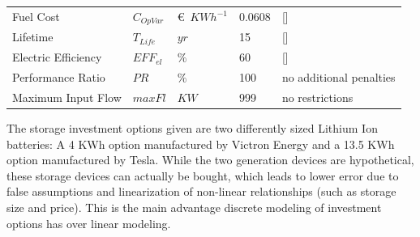 \documentclass[
	11pt,								%
	DIV10,								%
	a4paper,         					%
	oneside,							%
	headheight=20pt,					%
	footheight=20pt,					%
    parskip=full,						%
    listof=totoc,						%
	bibliography=totoc,					%
	index=totoc,						%
]{scrartcl}
\begin{document}
\begin{table}[H]
\begin{tabular}{lllll}
		Fuel	 Cost           			& $C_{OpVar}$     		& \euro\ $KWh^{-1}$   	& 0.0608			& [\cite{NaturalGasPrices2018}]  \\
		Lifetime                    & $T_{Life}$     		& $yr$  				& 15 				& [\cite{LAUINGER201624}]    \\
		Electric Efficiency         & $EFF_{el}$       		& $\%$  				& 60				& [\cite{BlueGENWorldsMost2018}]  \\
		Performance Ratio           & $PR$     		& $\%$  				& 100				& no additional penalties  \\
		Maximum Input Flow  			& $maxFl$     		& $KW$ 		 			& 999				& no restrictions  \\
		\hline
	\end{tabular}
\end{table}

The storage investment options given are two differently sized Lithium Ion batteries: A 4 KWh option manufactured by Victron Energy and a 13.5 KWh option manufactured by Tesla. While the two generation devices are hypothetical, these storage devices can actually be bought, which leads to lower error due to false assumptions and linearization of non-linear relationships (such as storage size and price). This is the main advantage discrete modeling of investment options has over linear modeling.
\end{document}
